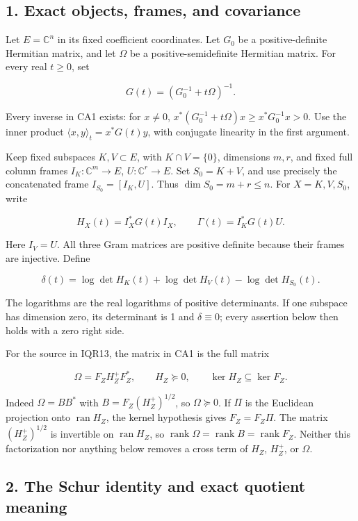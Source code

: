 \subsection{1. Exact objects, frames, and covariance}\label{exact-objects-frames-and-covariance}

Let \(E=\mathbb C^n\) in its fixed coefficient coordinates. Let \(G_0\) be a positive-definite Hermitian matrix, and let \(\Omega\) be a positive-semidefinite Hermitian matrix. For every real \(t\ge0\), set

\[
G(t)=(G_0^{-1}+t\Omega)^{-1}.
\tag{CA1}
\]

Every inverse in CA1 exists: for \(x\ne0\), \(x^*(G_0^{-1}+t\Omega)x\ge x^*G_0^{-1}x>0\). Use the inner product \(\langle x,y\rangle_t=x^*G(t)y\), with conjugate linearity in the first argument.

Keep fixed subspaces \(K,V\subset E\), with \(K\cap V=\{0\}\), dimensions \(m,r\), and fixed full column frames \(I_K:\mathbb C^m\to E\), \(U:\mathbb C^r\to E\). Set \(S_0=K+V\), and use precisely the concatenated frame \(I_{S_0}=[I_K,U]\). Thus \(\dim S_0=m+r\le n\). For \(X=K,V,S_0\), write

\[
H_X(t)=I_X^*G(t)I_X,
\qquad
\Gamma(t)=I_K^*G(t)U.
\tag{CA2}
\]

Here \(I_V=U\). All three Gram matrices are positive definite because their frames are injective. Define

\[
\delta(t)=\log\det H_K(t)+\log\det H_V(t)
-\log\det H_{S_0}(t).
\tag{CA3}
\]

The logarithms are the real logarithms of positive determinants. If one subspace has dimension zero, its determinant is 1 and \(\delta\equiv0\); every assertion below then holds with a zero right side.

For the source in IQR13, the matrix in CA1 is the full matrix

\[
\Omega=F_ZH_Z^+F_Z^*,
\qquad H_Z\succeq0,
\qquad \ker H_Z\subseteq\ker F_Z.
\tag{CA4}
\]

Indeed \(\Omega=BB^*\) with \(B=F_Z(H_Z^+)^{1/2}\), so \(\Omega\succeq0\). If \(\Pi\) is the Euclidean projection onto \(\operatorname{ran}H_Z\), the kernel hypothesis gives \(F_Z=F_Z\Pi\). The matrix \((H_Z^+)^{1/2}\) is invertible on \(\operatorname{ran}H_Z\), so \(\operatorname{rank}\Omega=\operatorname{rank}B=\operatorname{rank}F_Z\). Neither this factorization nor anything below removes a cross term of \(H_Z\), \(H_Z^+\), or \(\Omega\).

\subsection{2. The Schur identity and exact quotient meaning}\label{the-schur-identity-and-exact-quotient-meaning}

